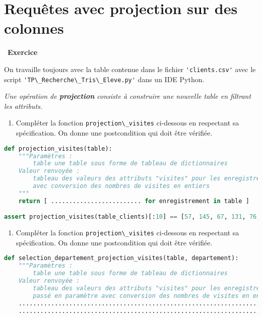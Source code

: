\documentclass[
  11pt,
]{article}
\newcommand{\passthrough}[1]{#1}
\providecommand{\tightlist}{%
  \setlength{\itemsep}{0pt}\setlength{\parskip}{0pt}}
\newcounter{exo}
\newenvironment{exercice}[1]
{\par \medskip   \addtocounter{exo}{1} \noindent  
\begin{bclogo}[arrondi =0.1,   noborder = true, logo=\bccrayon, marge=4]{~\textbf{Exercice} \textbf{\theexo} {\itshape #1} }  \par}
{
\end{bclogo}
 \par \bigskip }
\newcounter{def}
\begin{document}
\hypertarget{requuxeates-avec-projection-sur-des-colonnes}{%
\section{Requêtes avec projection sur des
colonnes}\label{requuxeates-avec-projection-sur-des-colonnes}}

\begin{exercice}{}

On travaille toujours avec la table contenue dans le fichier
\passthrough{\lstinline!'clients.csv'!} avec le script
\passthrough{\lstinline!'TP\_Recherche\_Tris\_Eleve.py'!} dans un IDE
Python.

\emph{Une opération de \textbf{projection} consiste à construire une
nouvelle table en filtrant les attributs.}

\begin{enumerate}
\def\labelenumi{\arabic{enumi}.}
\tightlist
\item
  Compléter la fonction \passthrough{\lstinline!projection\_visites!}
  ci-dessous en respectant sa spécification. On donne une postcondition
  qui doit être vérifiée.
\end{enumerate}

\begin{lstlisting}[language=Python]
def projection_visites(table):
    """Paramètres : 
        table une table sous forme de tableau de dictionnaires
    Valeur renvoyée :
        tableau des valeurs des attributs "visites" pour les enregistrements de table
        avec conversion des nombres de visites en entiers
    """
    return [ ......................... for enregistrement in table ]

assert projection_visites(table_clients)[:10] == [57, 145, 67, 131, 76, 52, 65, 3, 101, 18]
\end{lstlisting}

\begin{enumerate}
\def\labelenumi{\arabic{enumi}.}
\setcounter{enumi}{1}
\tightlist
\item
  Compléter la fonction \passthrough{\lstinline!projection\_visites!}
  ci-dessous en respectant sa spécification. On donne une postcondition
  qui doit être vérifiée.
\end{enumerate}

\begin{lstlisting}[language=Python]
def selection_departement_projection_visites(table, departement):
    """Paramètres : 
        table une table sous forme de tableau de dictionnaires
    Valeur renvoyée :
        tableau des valeurs des attributs "visites" pour les enregistrements de table du département
        passé en paramètre avec conversion des nombres de visites en entiers"""
    ...................................................................
    ...................................................................


\end{lstlisting}
\end{exercice}
\end{document}
